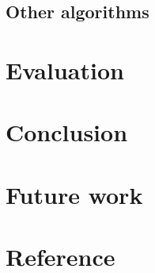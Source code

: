 \subsection{Other algorithms}

\section{Evaluation}

\section{Conclusion}

\section{Future work}

\section{Reference}
{}




